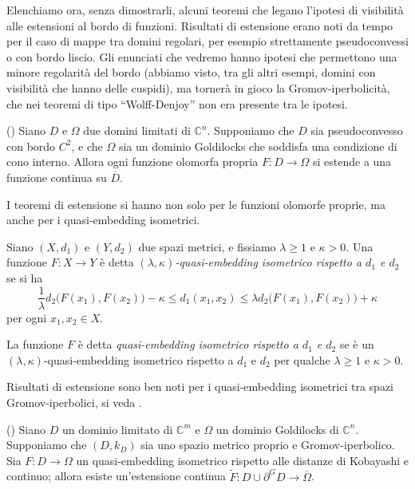 Elenchiamo ora, senza dimostrarli, alcuni teoremi che legano l'ipotesi di visibilità alle estensioni al bordo di funzioni. Risultati di estensione erano noti da tempo per il caso di mappe tra domini regolari, per esempio strettamente pseudoconvessi o con bordo liscio. Gli enunciati che vedremo hanno ipotesi che permettono una minore regolarità del bordo (abbiamo visto, tra gli altri esempi, domini con visibilità che hanno delle cuspidi), ma tornerà in gioco la Gromov-iperbolicità, che nei teoremi di tipo ``Wolff-Denjoy'' non era presente tra le ipotesi.

\begin{thm}
    (\cite[Theorem 1.5]{BZ1}) Siano $D$ e $\Omega$ due domini limitati di $\mathbb{C}^n$. Supponiamo che $D$ sia pseudoconvesso con bordo $C^2$, e che $\Omega$ sia un dominio Goldilocks che soddisfa una condizione di cono interno. Allora ogni funzione olomorfa propria $F:D\longrightarrow\Omega$ si estende a una funzione continua su $\overline{D}$.
\end{thm}

I teoremi di estensione si hanno non solo per le funzioni olomorfe proprie, ma anche per i quasi-embedding isometrici.

\begin{defn}
    Siano $(X,d_1)$ e $(Y,d_2)$ due spazi metrici, e fissiamo $\lambda\ge 1$ e $\kappa>0$. Una funzione $F:X\longrightarrow Y$ è detta \textit{$(\lambda,\kappa)$-quasi-embedding isometrico rispetto a $d_1$ e $d_2$} se si ha
    $$\frac{1}{\lambda}d_2\big(F(x_1),F(x_2)\big)-\kappa \le d_1(x_1,x_2) \le \lambda d_2\big(F(x_1),F(x_2)\big)+\kappa$$
    per ogni $x_1,x_2\in X$.
    
    La funzione $F$ è detta \textit{quasi-embedding isometrico rispetto a $d_1$ e $d_2$} se è un $(\lambda,\kappa)$-quasi-embedding isometrico rispetto a $d_1$ e $d_2$ per qualche $\lambda\ge 1$ e $\kappa>0$.
\end{defn}
\vspace*{-\baselineskip}

Risultati di estensione sono ben noti per i quasi-embedding isometrici tra spazi Gromov-iperbolici, si veda \cite[Part III, Chapter H, Theorem 3.9]{BH}.

\begin{thm}
    (\cite[Theorem 1.7]{BZ1}) Siano $D$ un dominio limitato di $\mathbb{C}^m$ e $\Omega$ un dominio Goldilocks di $\mathbb{C}^n$. Supponiamo che $(D,k_D)$ sia uno spazio metrico proprio e Gromov-iperbolico. Sia $F:D\longrightarrow\Omega$ un quasi-embedding isometrico rispetto alle distanze di Kobayashi e continuo; allora esiste un'estensione continua $\tilde{F}:D\cup\partial^GD\longrightarrow\overline{\Omega}$.
\end{thm}

